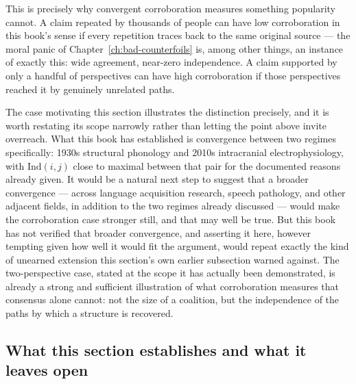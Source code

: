 This is precisely why convergent corroboration measures something popularity cannot. A claim repeated by thousands of people can have low corroboration in this book's sense if every repetition traces back to the same original source --- the moral panic of Chapter~\ref{ch:bad-counterfoils} is, among other things, an instance of exactly this: wide agreement, near-zero independence. A claim supported by only a handful of perspectives can have high corroboration if those perspectives reached it by genuinely unrelated paths.

The case motivating this section illustrates the distinction precisely, and it is worth restating its scope narrowly rather than letting the point above invite overreach. What this book has established is convergence between two regimes specifically: 1930s structural phonology and 2010s intracranial electrophysiology, with $\mathrm{Ind}(i,j)$ close to maximal between that pair for the documented reasons already given. It would be a natural next step to suggest that a broader convergence --- across language acquisition research, speech pathology, and other adjacent fields, in addition to the two regimes already discussed --- would make the corroboration case stronger still, and that may well be true. But this book has not verified that broader convergence, and asserting it here, however tempting given how well it would fit the argument, would repeat exactly the kind of unearned extension this section's own earlier subsection warned against. The two-perspective case, stated at the scope it has actually been demonstrated, is already a strong and sufficient illustration of what corroboration measures that consensus alone cannot: not the size of a coalition, but the independence of the paths by which a structure is recovered.

\subsection{What this section establishes and what it leaves open}

